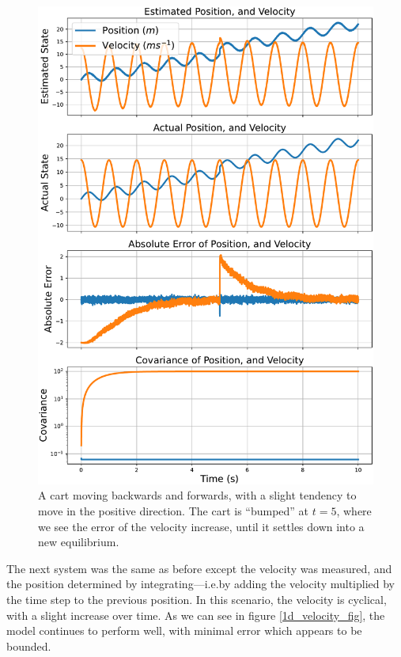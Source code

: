 \documentclass[12pt]{article}
\begin{document}
\begin{figure}[thp]
	\centering
	
	\includegraphics[height=0.8\textheight]{1d-position.pdf}
	
	\caption{A cart moving backwards and forwards, with a slight tendency to move in the positive direction. The cart is ``bumped'' at $t=5$, where we see the error of the velocity increase, until it settles down into a new equilibrium.}
	\label{1d_position_fig}
\end{figure}

The next system was the same as before except the velocity was measured, and the position determined by integrating---i.e.\@ by adding the velocity multiplied by the time step to the previous position. In this scenario, the velocity is cyclical, with a slight increase over time. As we can see in figure \ref{1d_velocity_fig}, the model continues to perform well, with minimal error which appears to be bounded.
\end{document}
